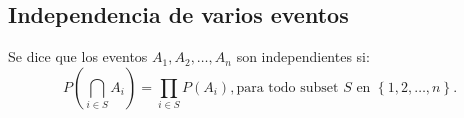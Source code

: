 \documentclass[a4paper,dvipsnames]{book}
\begin{document}
\subsection{Independencia de varios eventos}
\label{ssec:independencia_de_varios_eventos}

Se dice que los eventos \(A_1,A_2,\ldots,A_{n}\) son independientes si:
\[P\left(\bigcap_{i \in S} A_{i}\right)=\prod_{i\in S}P\left(A_{i}\right),
\text{para todo subset }S \text{ en }\left\{1,2,\ldots,n\right\} .\]
\end{document}
